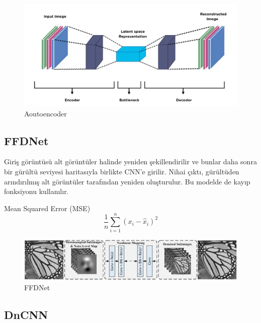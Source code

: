 \documentclass{article}
\begin{document}
\begin{figure}[htbp]
     \centering
\includegraphics[angle=360,width=1.1\textwidth]{autoencoder.png}\centering 
  \caption{Aoutoencoder\cite{Autoencoder}}
  \label{fig:resim_etiketi}
\end{figure}

\newpage
\subsection{FFDNet}

\noindent Giriş görüntüsü alt görüntüler halinde yeniden şekillendirilir ve bunlar daha sonra bir gürültü seviyesi haritasıyla birlikte CNN’e girilir. Nihai çıktı, gürültüden arındırılmış alt görüntüler tarafından yeniden oluşturulur. Bu modelde de kayıp fonksiyonu kullanılır.
\vspace{1 cm}

Mean Squared Error (MSE) 
\begin{equation}
    \frac{1}{n} \sum_{i=1}^{n} (x_{i} - \hat{x}_{i})^2
\end{equation}

\renewcommand{\figurename}{Şekil}

\begin{figure}[htbp]
     \centering
\includegraphics[angle=360,width=1.1\textwidth]{ffdnet.jpeg}\centering 
  \caption{FFDNet\cite{zhang2018ffdnet}}
  \label{fig:resim_etiketi}
\end{figure}

\subsection{DnCNN}
\end{document}
